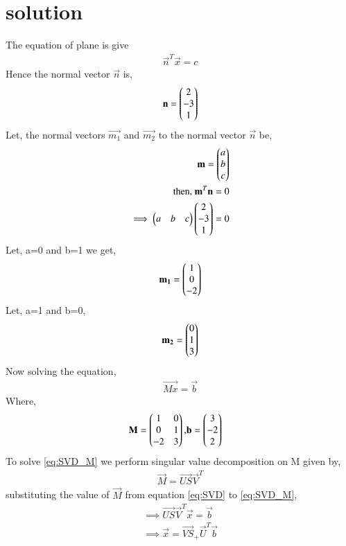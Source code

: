 \documentclass[journal,12pt,twocolumn]{IEEEtran}
\begin{document}
\section{solution}
The equation of plane is give 
\begin{align}
\vec{n}^T\vec{x} = c
\end{align}
Hence the normal vector $\vec{n}$ is,
\begin{align}
\mathbf{n} = \begin{pmatrix}2\\-3\\1\end{pmatrix}
\end{align}
Let, the normal vectors $\vec{m_1}$ and $\vec{m_2}$ to the normal vector $\vec{n}$ be, 
\begin{align}
\mathbf{m} = \begin{pmatrix}a\\b\\c\end{pmatrix}\\
\mbox{then, } \mathbf{m}^T\mathbf{n} = 0\\
\implies \begin{pmatrix}a&b&c\end{pmatrix}\begin{pmatrix}2\\-3\\1\end{pmatrix} = 0
\end{align}  
Let, a=0 and b=1 we get,
\begin{align}
\mathbf{m_1} = \begin{pmatrix}1\\0\\-2\end{pmatrix}
\end{align}
Let, a=1 and b=0,
\begin{align}
\mathbf{m_2} = \begin{pmatrix}0\\1\\3\end{pmatrix}
\end{align}
Now solving the equation,
\begin{align}
\vec{Mx} = \vec{b}
\label{eq:SVD_M}
\end{align}
Where,
\begin{align}
\mathbf{M} = \begin{pmatrix}1&0\\0&1\\-2&3\end{pmatrix} , & \mathbf{b} = \begin{pmatrix}3\\-2\\2\end{pmatrix}\label{eq:b}
\end{align}
To solve \eqref{eq:SVD_M} we perform singular value decomposition on M given by, 
\begin{align}
\vec{M} = \vec{US}\vec{V}^T
\label{eq:SVD}
\end{align}
substituting the value of $\vec{M}$ from equation \eqref{eq:SVD} to \eqref{eq:SVD_M},
\begin{align}
\implies \vec{US}\vec{V}^T\vec{x} = \vec{b}\\
\implies \vec{x} = \vec{VS}_+\vec{U}^T\vec{b} \label{eq:x}
\end{align}
\end{document}
